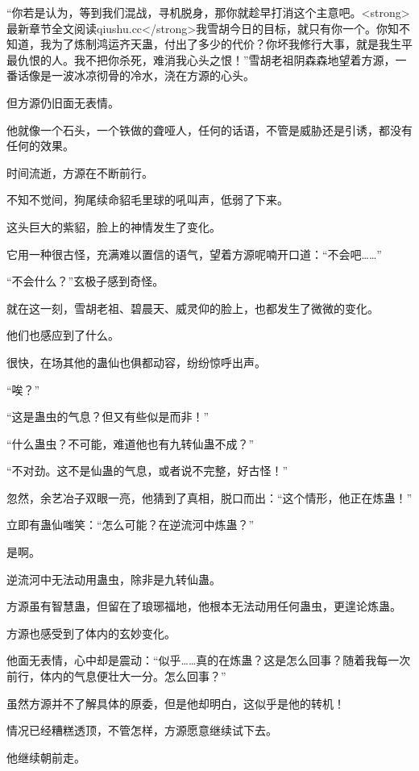 
\begin{this_body}

“你若是认为，等到我们混战，寻机脱身，那你就趁早打消这个主意吧。<strong>最新章节全文阅读qiushu.cc</strong>我雪胡今日的目标，就只有你一个。你知不知道，我为了炼制鸿运齐天蛊，付出了多少的代价？你坏我修行大事，就是我生平最仇恨的人。我不把你杀死，难消我心头之恨！”雪胡老祖阴森森地望着方源，一番话像是一波冰凉彻骨的冷水，浇在方源的心头。

但方源仍旧面无表情。

他就像一个石头，一个铁做的聋哑人，任何的话语，不管是威胁还是引诱，都没有任何的效果。

时间流逝，方源在不断前行。

不知不觉间，狗尾续命貂毛里球的吼叫声，低弱了下来。

这头巨大的紫貂，脸上的神情发生了变化。

它用一种很古怪，充满难以置信的语气，望着方源呢喃开口道：“不会吧……”

“不会什么？”玄极子感到奇怪。

就在这一刻，雪胡老祖、碧晨天、威灵仰的脸上，也都发生了微微的变化。

他们也感应到了什么。

很快，在场其他的蛊仙也俱都动容，纷纷惊呼出声。

“唉？”

“这是蛊虫的气息？但又有些似是而非！”

“什么蛊虫？不可能，难道他也有九转仙蛊不成？”

“不对劲。这不是仙蛊的气息，或者说不完整，好古怪！”

忽然，余艺冶子双眼一亮，他猜到了真相，脱口而出：“这个情形，他正在炼蛊！”

立即有蛊仙嗤笑：“怎么可能？在逆流河中炼蛊？”

是啊。

逆流河中无法动用蛊虫，除非是九转仙蛊。

方源虽有智慧蛊，但留在了琅琊福地，他根本无法动用任何蛊虫，更遑论炼蛊。

方源也感受到了体内的玄妙变化。

他面无表情，心中却是震动：“似乎……真的在炼蛊？这是怎么回事？随着我每一次前行，体内的气息便壮大一分。怎么回事？”

虽然方源并不了解具体的原委，但是他却明白，这似乎是他的转机！

情况已经糟糕透顶，不管怎样，方源愿意继续试下去。

他继续朝前走。


\end{this_body}
